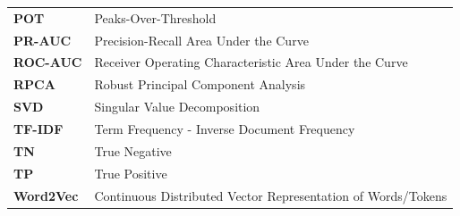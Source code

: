 \begin{tabular}{ll}
\textbf{POT} & Peaks-Over-Threshold \\
\textbf{PR-AUC} & Precision-Recall Area Under the Curve \\
\textbf{ROC-AUC} & Receiver Operating Characteristic Area Under the Curve \\
\textbf{RPCA} & Robust Principal Component Analysis \\
\textbf{SVD} & Singular Value Decomposition \\
\textbf{TF-IDF} & Term Frequency - Inverse Document Frequency \\
\textbf{TN} & True Negative \\
\textbf{TP} & True Positive \\
\textbf{Word2Vec} & Continuous Distributed Vector Representation of Words/Tokens \\
\end{tabular}

